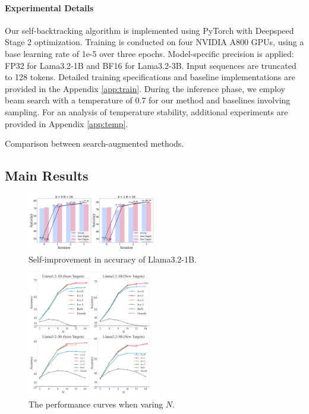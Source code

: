 \documentclass{article}
\theoremstyle{plain}
\theoremstyle{definition}
\theoremstyle{remark}
\begin{document}
\paragraph{Experimental Details}
Our self-backtracking algorithm is implemented using PyTorch with Deepspeed Stage 2 optimization. Training is conducted on four NVIDIA A800 GPUs, using a base learning rate of 1e-5 over three epochs. Model-specific precision is applied: FP32 for Lama3.2-1B and BF16 for Lama3.2-3B. Input sequences are truncated to 128 tokens. Detailed training specifications and baseline implementations are provided in the Appendix \ref{app:train}. During the inference phase, we employ beam search with a temperature of 0.7 for our method and baselines involving sampling.
For an analysis of temperature stability, additional experiments are provided in Appendix \ref{app:temp}.
\begin{table}[t]
\centering
\caption{Comparison between search-augmented methods.}
\label{small}

\end{table}
\subsection{Main Results}
\begin{figure}[t]
    \centering
\includegraphics[width=0.50\textwidth]{fig/improvement_comparison.png}
\vspace{-10pt}
    \caption{Self-improvement in accuracy of Llama3.2-1B.}
    \label{fig:improvement}
\end{figure}
\begin{figure}[htbp]
    \centering
\includegraphics[width=0.485\textwidth]{fig/kncurve.png}
\vspace{-10pt}
    \caption{The performance curves when varing $N$.}
    \label{fig:bn}
\end{figure}
\end{document}
